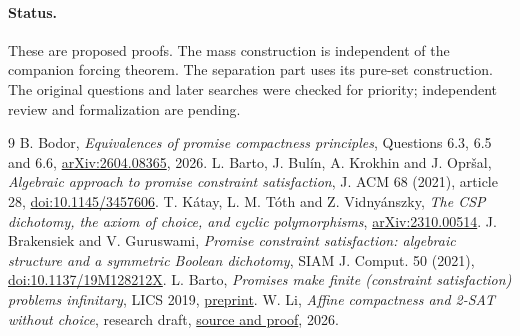 \documentclass[11pt]{article}
\begin{document}
\paragraph{Status.}
These are proposed proofs. The mass construction is independent of the companion forcing theorem. The separation part uses its pure-set construction. The original questions and later searches were checked for priority; independent review and formalization are pending.

\begin{thebibliography}{9}
 B. Bodor, \emph{Equivalences of promise compactness principles}, Questions 6.3, 6.5 and 6.6, \href{https://arxiv.org/abs/2604.08365}{arXiv:2604.08365}, 2026.
 L. Barto, J. Bul\'in, A. Krokhin and J. Opr\v sal, \emph{Algebraic approach to promise constraint satisfaction}, J. ACM 68 (2021), article 28, \href{https://doi.org/10.1145/3457606}{doi:10.1145/3457606}.
 T. K\'atay, L. M. T\'oth and Z. Vidny\'anszky, \emph{The CSP dichotomy, the axiom of choice, and cyclic polymorphisms}, \href{https://arxiv.org/abs/2310.00514}{arXiv:2310.00514}.
 J. Brakensiek and V. Guruswami, \emph{Promise constraint satisfaction: algebraic structure and a symmetric Boolean dichotomy}, SIAM J. Comput. 50 (2021), \href{https://doi.org/10.1137/19M128212X}{doi:10.1137/19M128212X}.
 L. Barto, \emph{Promises make finite (constraint satisfaction) problems infinitary}, LICS 2019, \href{https://arxiv.org/abs/1909.04878}{preprint}.
 W. Li, \emph{Affine compactness and 2-SAT without choice}, research draft, \href{https://github.com/VictorLiwentao/solved-problems/tree/f7b1744/results/set-theory/affine-compactness}{source and proof}, 2026.
\end{thebibliography}
\end{document}
